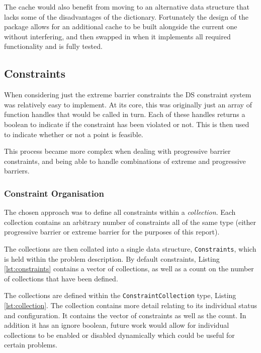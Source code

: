 The cache would also benefit from moving to an alternative data structure that lacks some of the disadvantages of the dictionary. Fortunately the design of the package allows for an additional cache to be built alongside the current one without interfering, and then swapped in when it implements all required functionality and is fully tested.

\subsection{Constraints}
When considering just the extreme barrier constraints the DS constraint system was relatively easy to implement. At its core, this was originally just an array of function handles that would be called in turn. Each of these handles returns a boolean to indicate if the constraint has been violated or not. This is then used to indicate whether or not a point is feasible. 

This process became more complex when dealing with progressive barrier constraints, and being able to handle combinations of extreme and progressive barriers. 

\subsubsection{Constraint Organisation}
The chosen approach was to define all constraints within a \textit{collection}. Each collection contains an arbitrary number of constraints all of the same type (either progressive barrier or extreme barrier for the purposes of this report).

The collections are then collated into a single data structure, \texttt{Constraints}, which is held within the problem description. By default constraints, Listing \ref{lst:constraints} contains a vector of collections, as well as a count on the number of collections that have been defined.

\begin{figure}[tb]
    
\end{figure}

The collections are defined within the \texttt{ConstraintCollection} type, Listing \ref{lst:collection}. The collection contains more detail relating to its individual status and configuration. It contains the vector of constraints as well as the count. In addition it has an ignore boolean, future work would allow for individual collections to be enabled or disabled dynamically which could be useful for certain problems.

